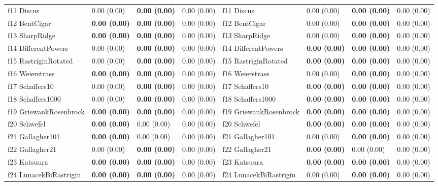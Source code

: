 \begin{table}
\begin{tabular}{llllllll}
f11 Discus & 0.00 (0.00) & \textbf{0.00 (0.00)} & 0.00 (0.00) & f11 Discus & 0.00 (0.00) & \textbf{0.00 (0.00)} & 0.00 (0.00) \\
f12 BentCigar & \textbf{0.00 (0.00)} & \textbf{0.00 (0.00)} & 0.00 (0.00) & f12 BentCigar & 0.00 (0.00) & \textbf{0.00 (0.00)} & 0.00 (0.00) \\
f13 SharpRidge & \textbf{0.00 (0.00)} & \textbf{0.00 (0.00)} & 0.00 (0.00) & f13 SharpRidge & 0.00 (0.00) & \textbf{0.00 (0.00)} & 0.00 (0.00) \\
f14 DifferentPowers & 0.00 (0.00) & \textbf{0.00 (0.00)} & 0.00 (0.00) & f14 DifferentPowers & \textbf{0.00 (0.00)} & \textbf{0.00 (0.00)} & 0.00 (0.00) \\
f15 RastriginRotated & 0.00 (0.00) & \textbf{0.00 (0.00)} & 0.00 (0.00) & f15 RastriginRotated & \textbf{0.00 (0.00)} & \textbf{0.00 (0.00)} & 0.00 (0.00) \\
f16 Weierstrass & \textbf{0.00 (0.00)} & \textbf{0.00 (0.00)} & 0.00 (0.00) & f16 Weierstrass & 0.00 (0.00) & \textbf{0.00 (0.00)} & 0.00 (0.00) \\
f17 Schaffers10 & 0.00 (0.00) & \textbf{0.00 (0.00)} & 0.00 (0.00) & f17 Schaffers10 & \textbf{0.00 (0.00)} & \textbf{0.00 (0.00)} & 0.00 (0.00) \\
f18 Schaffers1000 & 0.00 (0.00) & \textbf{0.00 (0.00)} & 0.00 (0.00) & f18 Schaffers1000 & \textbf{0.00 (0.00)} & \textbf{0.00 (0.00)} & 0.00 (0.00) \\
f19 GriewankRosenbrock & \textbf{0.00 (0.00)} & \textbf{0.00 (0.00)} & 0.00 (0.00) & f19 GriewankRosenbrock & \textbf{0.00 (0.00)} & \textbf{0.00 (0.00)} & 0.00 (0.00) \\
f20 Schwefel & \textbf{0.00 (0.00)} & 0.00 (0.00) & 0.00 (0.00) & f20 Schwefel & \textbf{0.00 (0.00)} & \textbf{0.00 (0.00)} & 0.00 (0.00) \\
f21 Gallagher101 & \textbf{0.00 (0.00)} & 0.00 (0.00) & 0.00 (0.00) & f21 Gallagher101 & 0.00 (0.00) & \textbf{0.00 (0.00)} & 0.00 (0.00) \\
f22 Gallagher21 & 0.00 (0.00) & \textbf{0.00 (0.00)} & 0.00 (0.00) & f22 Gallagher21 & \textbf{0.00 (0.00)} & 0.00 (0.00) & 0.00 (0.00) \\
f23 Katsuura & \textbf{0.00 (0.00)} & \textbf{0.00 (0.00)} & 0.00 (0.00) & f23 Katsuura & \textbf{0.00 (0.00)} & \textbf{0.00 (0.00)} & 0.00 (0.00) \\
f24 LunacekBiRastrigin & \textbf{0.00 (0.00)} & \textbf{0.00 (0.00)} & 0.00 (0.00) & f24 LunacekBiRastrigin & 0.00 (0.00) & \textbf{0.00 (0.00)} & 0.00 (0.00) \\
\bottomrule
\end{tabular}
\end{table}
